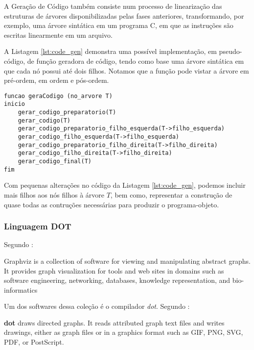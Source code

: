 A Geração de Código também consiste num processo de linearização das
estruturas de árvores disponibilizadas pelas fases anteriores, transformando,
por exemplo, uma árvore sintática em um programa C, em que as instruções são
escritas linearmente em um arquivo.

A Listagem \ref{lst:code_gen} demonstra uma possível implementação, em
pseudo-código, de função geradora de código, tendo como base uma árvore
sintática em que cada nó possui até dois filhos. Notamos que a função pode
vistar a árvore em pré-ordem, em ordem e pós-ordem.

\begin{lstlisting}[label=lst:code_gen,caption=Exemplo Gerador de Código]
funcao geraCodigo (no_arvore T)
inicio
	gerar_codigo_preparatorio(T)
	gerar_codigo(T)
	gerar_codigo_preparatorio_filho_esquerda(T->filho_esquerda)
	gerar_codigo_filho_esquerda(T->filho_esquerda)
	gerar_codigo_preparatorio_filho_direita(T->filho_direita)
	gerar_codigo_filho_direita(T->filho_direita)
	gerar_codigo_final(T)
fim
\end{lstlisting}

Com pequenas alterações no código da Listagem \ref{lst:code_gen}, podemos
incluir mais filhos aos nós filhos à árvore $T$, bem como, representar a
construção de quase todas as contruções necessárias para produzir o
programa-objeto.


\subsubsection{Linguagem DOT}
\label{sec:impl_gen_dot}

Segundo :

\begin{citacao}{4cm}{0cm}
Graphviz is a collection of software for viewing and manipulating abstract
graphs. It provides graph visualization for tools and web sites in domains
such as software engineering, networking, databases, knowledge representation,
and bio-informatics
\end{citacao}

Um dos softwares dessa coleção é o compilador \emph{dot}. Segundo
:

\begin{citacao}{4cm}{0cm}
\textbf{dot} draws directed graphs. It reads attributed graph text files and
writes drawings, either as graph files or in a graphics format such as GIF,
PNG, SVG, PDF, or PostScript.
\end{citacao}

